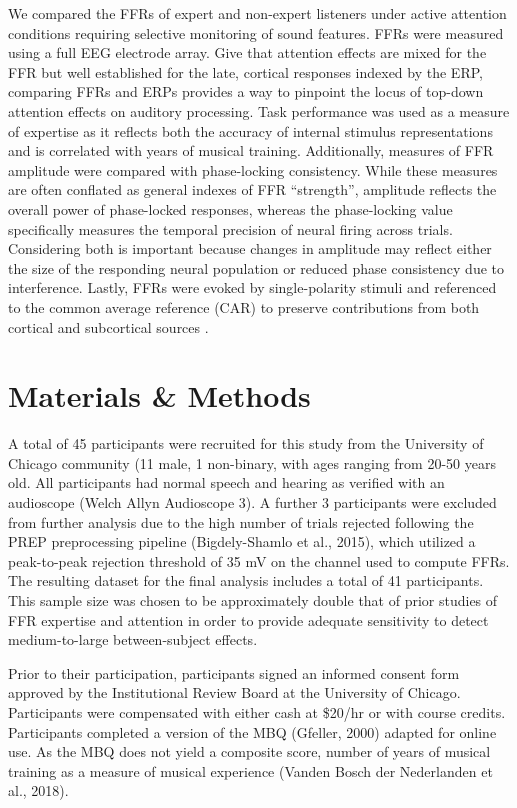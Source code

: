 \documentclass{article}
\begin{document}
We compared the FFRs of expert and non-expert listeners under active attention conditions requiring selective monitoring of sound features. FFRs were measured using a full EEG electrode array. Give that attention effects are mixed for the FFR but well established for the late, cortical responses indexed by the ERP, comparing FFRs and ERPs provides a way to pinpoint the locus of top-down attention effects on auditory processing. Task performance was used as a measure of expertise as it reflects both the accuracy of internal stimulus representations and is correlated with years of musical training. Additionally, measures of FFR amplitude were compared with phase-locking consistency. While these measures are often conflated as general indexes of FFR “strength”, amplitude reflects the overall power of phase-locked responses, whereas the phase-locking value \parencite[PLV; ][]{Lachaux_1999, Zhu_2013} specifically measures the temporal precision of neural firing across trials. Considering both is important because changes in amplitude may reflect either the size of the responding neural population or reduced phase consistency due to interference. Lastly, FFRs were evoked by single-polarity stimuli and referenced to the common average reference (CAR) to preserve contributions from both cortical and subcortical sources \parencite{Bidelman_2015b}.

\section*{Materials \& Methods}

A total of 45 participants were recruited for this study from the University of Chicago community (11 male, 1 non-binary, with ages ranging from 20-50 years old. All participants had normal speech and hearing as verified with an audioscope (Welch Allyn Audioscope 3). A further 3 participants were excluded from further analysis due to the high number of trials rejected following the PREP preprocessing pipeline (Bigdely-Shamlo et al., 2015), which utilized a peak-to-peak rejection threshold of 35 mV on the channel used to compute FFRs. The resulting dataset for the final analysis includes a total of 41 participants. This sample size was chosen to be approximately double that of prior studies of FFR expertise and attention \parencite[e.g., ][]{Sch_ller_2023, Price_2020, Lehmann_2014, Parbery_Clark_2009, Song_2008} in order to provide adequate sensitivity to detect medium-to-large between-subject effects.

Prior to their participation, participants signed an informed consent form approved by the Institutional Review Board at the University of Chicago. Participants were compensated with either cash at \$20/hr or with course credits. Participants completed a version of the MBQ (Gfeller, 2000) adapted for online use. As the MBQ does not yield a composite score, number of years of musical training as a measure of musical experience (Vanden Bosch der Nederlanden et al., 2018). 
\end{document}
